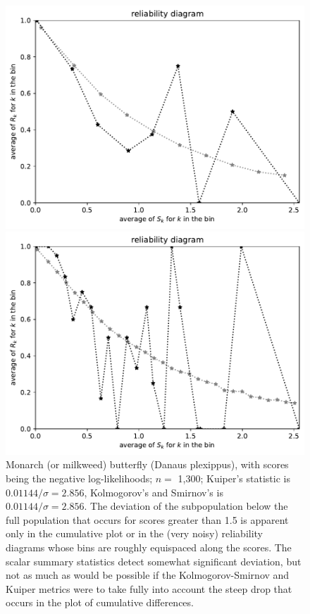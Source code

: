 \documentclass{article}
\begin{document}
\begin{figure}
\begin{centering}
\parbox{\imsize}{\includegraphics[width=\imsize]
{./codes/unweighted/nll-1-323-monarch-monarch-butterfly-milkweed-butterfly-Danaus-plexippusequiscore10}}
\quad\quad
\parbox{\imsize}{\includegraphics[width=\imsize]
{./codes/unweighted/nll-1-323-monarch-monarch-butterfly-milkweed-butterfly-Danaus-plexippusequiscore30}}

\end{centering}
\caption{Monarch (or milkweed) butterfly (Danaus plexippus),
         with scores being the negative log-likelihoods;
         $n =$ 1,300; Kuiper's statistic is $0.01144 / \sigma = 2.856$,
         Kolmogorov's and Smirnov's is $0.01144 / \sigma = 2.856$.
The deviation of the subpopulation below the full population that occurs
for scores greater than 1.5 is apparent only in the cumulative plot
or in the (very noisy) reliability diagrams whose bins
are roughly equispaced along the scores.
The scalar summary statistics detect somewhat significant deviation,
but not as much as would be possible if the Kolmogorov-Smirnov
and Kuiper metrics were to take fully into account the steep drop that occurs
in the plot of cumulative differences.
}
\label{monarch-monarch-butterfly-milkweed-butterfly-Danaus-plexippus-nll}
\end{figure}
\end{document}
